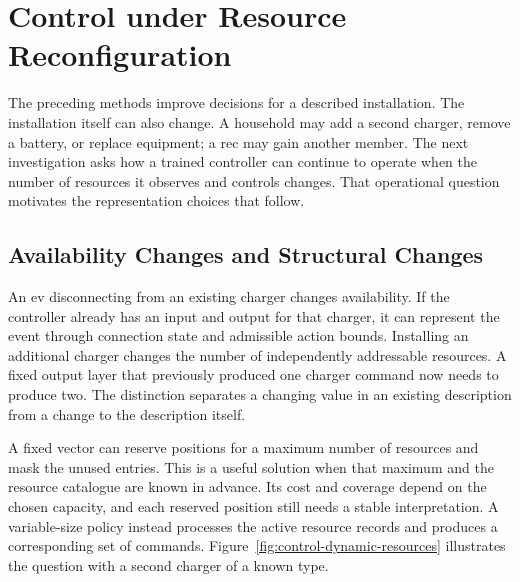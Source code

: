 \section{Control under Resource Reconfiguration}
\label{sec:control-dynamic-resources}
\label{sec:control-transformer-ppo}
\label{sec:control-transformer-matd3}

The preceding methods improve decisions for a described installation. The installation itself can also change. A household may add a second charger, remove a battery, or replace equipment; a \gls{rec} may gain another member. The next investigation asks how a trained controller can continue to operate when the number of resources it observes and controls changes. That operational question motivates the representation choices that follow.

\begin{center}
\end{center}

\subsection{Availability Changes and Structural Changes}

An \gls{ev} disconnecting from an existing charger changes availability. If the controller already has an input and output for that charger, it can represent the event through connection state and admissible action bounds. Installing an additional charger changes the number of independently addressable resources. A fixed output layer that previously produced one charger command now needs to produce two. The distinction separates a changing value in an existing description from a change to the description itself.

A fixed vector can reserve positions for a maximum number of resources and mask the unused entries. This is a useful solution when that maximum and the resource catalogue are known in advance. Its cost and coverage depend on the chosen capacity, and each reserved position still needs a stable interpretation. A variable-size policy instead processes the active resource records and produces a corresponding set of commands. Figure~\ref{fig:control-dynamic-resources} illustrates the question with a second charger of a known type.

